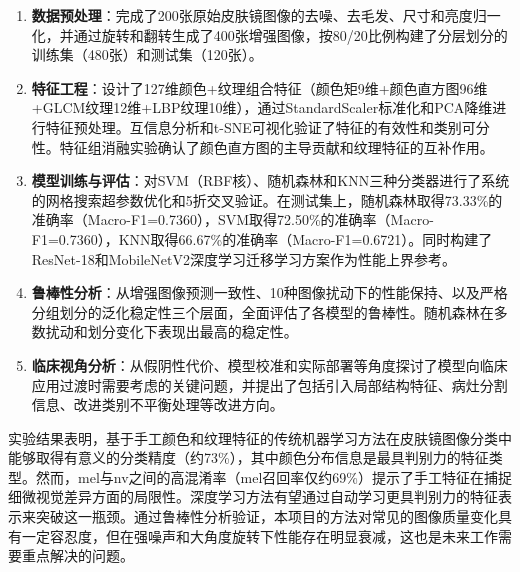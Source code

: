 \documentclass[UTF8,a4paper,12pt]{ctexart}
\numberwithin{figure}{section}
\numberwithin{table}{section}
\begin{document}
\begin{enumerate}
    \item \textbf{数据预处理}：完成了200张原始皮肤镜图像的去噪、去毛发、尺寸和亮度归一化，并通过旋转和翻转生成了400张增强图像，按80/20比例构建了分层划分的训练集（480张）和测试集（120张）。

    \item \textbf{特征工程}：设计了127维颜色+纹理组合特征（颜色矩9维+颜色直方图96维+GLCM纹理12维+LBP纹理10维），通过StandardScaler标准化和PCA降维进行特征预处理。互信息分析和t-SNE可视化验证了特征的有效性和类别可分性。特征组消融实验确认了颜色直方图的主导贡献和纹理特征的互补作用。

    \item \textbf{模型训练与评估}：对SVM（RBF核）、随机森林和KNN三种分类器进行了系统的网格搜索超参数优化和5折交叉验证。在测试集上，随机森林取得73.33\%的准确率（Macro-F1=0.7360），SVM取得72.50\%的准确率（Macro-F1=0.7360），KNN取得66.67\%的准确率（Macro-F1=0.6721）。同时构建了ResNet-18和MobileNetV2深度学习迁移学习方案作为性能上界参考。

    \item \textbf{鲁棒性分析}：从增强图像预测一致性、10种图像扰动下的性能保持、以及严格分组划分的泛化稳定性三个层面，全面评估了各模型的鲁棒性。随机森林在多数扰动和划分变化下表现出最高的稳定性。

    \item \textbf{临床视角分析}：从假阴性代价、模型校准和实际部署等角度探讨了模型向临床应用过渡时需要考虑的关键问题，并提出了包括引入局部结构特征、病灶分割信息、改进类别不平衡处理等改进方向。
\end{enumerate}

实验结果表明，基于手工颜色和纹理特征的传统机器学习方法在皮肤镜图像分类中能够取得有意义的分类精度（约73\%），其中颜色分布信息是最具判别力的特征类型。然而，mel与nv之间的高混淆率（mel召回率仅约69\%）提示了手工特征在捕捉细微视觉差异方面的局限性。深度学习方法有望通过自动学习更具判别力的特征表示来突破这一瓶颈。通过鲁棒性分析验证，本项目的方法对常见的图像质量变化具有一定容忍度，但在强噪声和大角度旋转下性能存在明显衰减，这也是未来工作需要重点解决的问题。
\end{document}
